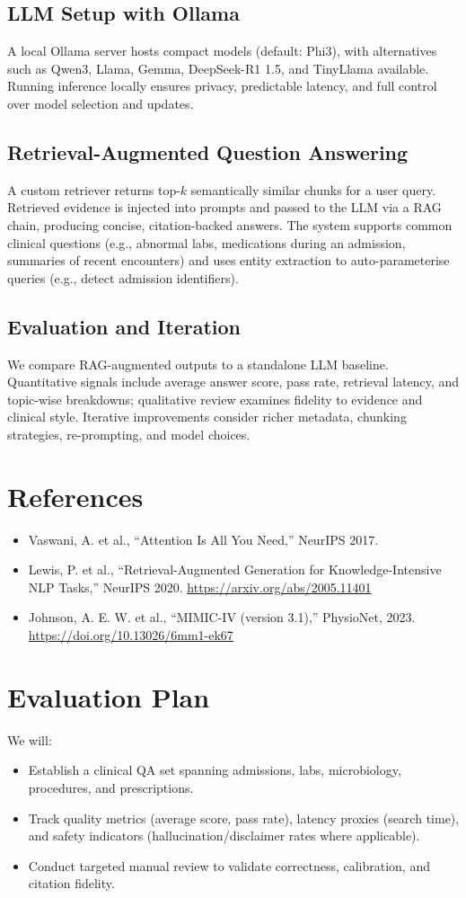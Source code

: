 \subsection{LLM Setup with Ollama}
A local Ollama server hosts compact models (default: Phi3), with alternatives such as Qwen3, Llama, Gemma, DeepSeek-R1 1.5, and TinyLlama available. Running inference locally ensures privacy, predictable latency, and full control over model selection and updates.

\subsection{Retrieval-Augmented Question Answering}
A custom retriever returns top-$k$ semantically similar chunks for a user query. Retrieved evidence is injected into prompts and passed to the LLM via a RAG chain, producing concise, citation-backed answers. The system supports common clinical questions (e.g., abnormal labs, medications during an admission, summaries of recent encounters) and uses entity extraction to auto-parameterise queries (e.g., detect admission identifiers).

\subsection{Evaluation and Iteration}
We compare RAG-augmented outputs to a standalone LLM baseline. Quantitative signals include average answer score, pass rate, retrieval latency, and topic-wise breakdowns; qualitative review examines fidelity to evidence and clinical style. Iterative improvements consider richer metadata, chunking strategies, re-prompting, and model choices.

\section{References}
\begin{itemize}
  \item Vaswani, A. et al., ``Attention Is All You Need,'' NeurIPS 2017.
  \item Lewis, P. et al., ``Retrieval-Augmented Generation for Knowledge-Intensive NLP Tasks,'' NeurIPS 2020. \url{https://arxiv.org/abs/2005.11401}
  \item Johnson, A. E. W. et al., ``MIMIC-IV (version 3.1),'' PhysioNet, 2023. \url{https://doi.org/10.13026/6mm1-ek67}
\end{itemize}

\section{Evaluation Plan}
We will:
\begin{itemize}
  \item Establish a clinical QA set spanning admissions, labs, microbiology, procedures, and prescriptions.
  \item Track quality metrics (average score, pass rate), latency proxies (search time), and safety indicators (hallucination/disclaimer rates where applicable).
  \item Conduct targeted manual review to validate correctness, calibration, and citation fidelity.
\end{itemize}


